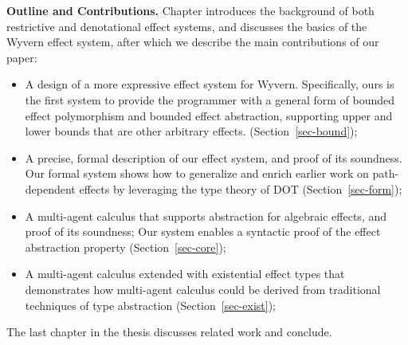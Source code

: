 \noindent\textbf{Outline and Contributions.}  
Chapter introduces the background of both restrictive and denotational effect systems, and discusses the basics of the Wyvern effect system, after which we describe the main contributions of our paper:
\begin{itemize}
\item A design of a more expressive effect system for Wyvern. Specifically, ours is the first system to provide the programmer with a general form of bounded effect polymorphism and bounded effect abstraction, supporting upper and lower bounds that are other arbitrary effects.  (Section~\ref{sec-bound});
\item A precise, formal description of our effect system, and proof of its soundness.  Our formal system shows how to generalize and enrich earlier work on path-dependent effects by leveraging the type theory of DOT (Section~\ref{sec-form});
\item A multi-agent calculus  that supports abstraction for algebraic effects, and proof of its soundness;  Our system enables a syntactic proof of the effect abstraction property (Section~\ref{sec-core});
\item A multi-agent calculus extended with existential effect types that demonstrates how multi-agent calculus could be derived from traditional techniques of type abstraction (Section~\ref{sec-exist});
\end{itemize}
The last chapter in the thesis discusses related work and conclude.
